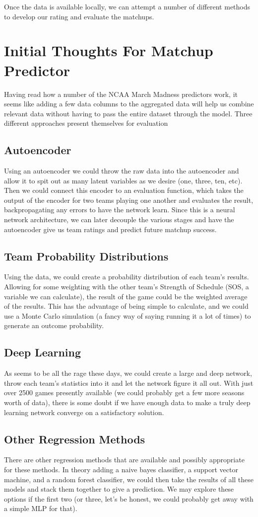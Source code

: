 \documentclass[11pt,a4paper]{article}
\begin{document}
Once the data is available locally, we can attempt a number of different methods to develop our rating and evaluate the matchups. 

\section*{Initial Thoughts For Matchup Predictor}
Having read how a number of the NCAA March Madness predictors work, it seems like adding a few data columns to the aggregated data will help us combine relevant data without having to pass the entire dataset through the model. 
Three different approaches present themselves for evaluation 
\subsection*{Autoencoder} 
Using an autoencoder we could throw the raw data into the autoencoder and allow it to spit out as many latent variables as we desire (one, three, ten, etc). Then we could connect this encoder to an evaluation function, which takes the output of the encoder for two teams playing one another and evaluates the result, backpropagating any errors to have the network learn. 
Since this is a neural network architecture, we can later decouple the various stages and have the autoencoder give us team ratings and predict future matchup success.

\subsection*{Team Probability Distributions}
Using the data, we could create a probability distribution of each team's results. Allowing for some weighting with the other team's Strength of Schedule (SOS, a variable we can calculate), the result of the game could be the weighted average of the results. This has the advantage of being simple to calculate, and we could use a Monte Carlo simulation (a fancy way of saying running it a lot of times) to generate an outcome probability.

\subsection*{Deep Learning}
As seems to be all the rage these days, we could create a large and deep network, throw each team's statistics into it and let the network figure it all out. With just over 2500 games presently available (we could probably get a few more seasons worth of data), there is some doubt if we have enough data to make a truly deep learning network converge on a satisfactory solution.

\subsection*{Other Regression Methods}
There are other regression methods that are available and possibly appropriate for these methods. In theory adding a naive bayes classifier, a support vector machine, and a random forest classifier, we could then take the results of all these models and stack them together to give a prediction. We may explore these options if the first two (or three, let's be honest, we could probably get away with a simple MLP for that).
\end{document}

